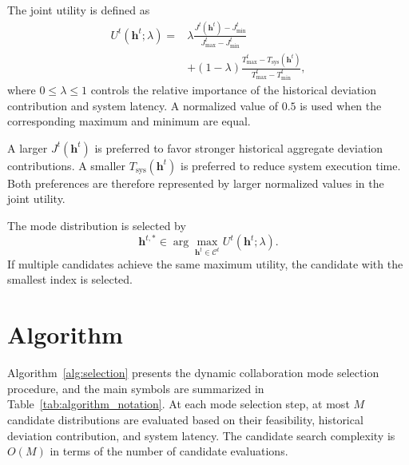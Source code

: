 \documentclass[5p,times]{elsarticle}
\theoremstyle{plain}
\theoremstyle{definition}
\theoremstyle{remark}
\begin{document}
	The joint utility is defined as
	\begin{equation}
		\begin{aligned}
			U^t(\mathbf h^t;\lambda)
			={}&\lambda
			\frac{J^t(\mathbf h^t)-J_{\min}^t}
			{J_{\max}^t-J_{\min}^t}\\
			&+(1-\lambda)
			\frac{T_{\max}^t-T_{\mathrm{sys}}(\mathbf h^t)}
			{T_{\max}^t-T_{\min}^t},
		\end{aligned}
		\label{eq:joint_utility}
	\end{equation}
	where $0\leq\lambda\leq1$ controls the relative
	importance of the historical deviation
	contribution and system latency.
	A normalized value of $0.5$ is used when
	the corresponding maximum and minimum are equal.
	
	A larger $J^t(\mathbf h^t)$ is preferred
	to favor stronger historical aggregate
	deviation contributions.
	A smaller $T_{\mathrm{sys}}(\mathbf h^t)$
	is preferred to reduce system execution time.
	Both preferences are therefore represented
	by larger normalized values in the joint utility.
	
	The mode distribution is selected by
	\begin{equation}
		\mathbf h^{t,\ast}
		\in
		\arg\max_{\mathbf h^t\in\mathcal C^t}
		U^t(\mathbf h^t;\lambda).
		\label{eq:joint_selection}
	\end{equation}
	If multiple candidates achieve the same
	maximum utility, the candidate with the
	smallest index is selected.
	
	\section{Algorithm}
	\label{sec:algorithm}
	
	Algorithm~\ref{alg:selection} presents the
	dynamic collaboration mode selection procedure,
	and the main symbols are summarized in
	Table~\ref{tab:algorithm_notation}.
	At each mode selection step, at most $M$
	candidate distributions are evaluated
	based on their feasibility, historical
	deviation contribution, and system latency.
	The candidate search complexity is $O(M)$
	in terms of the number of candidate evaluations.
	
\end{document}
